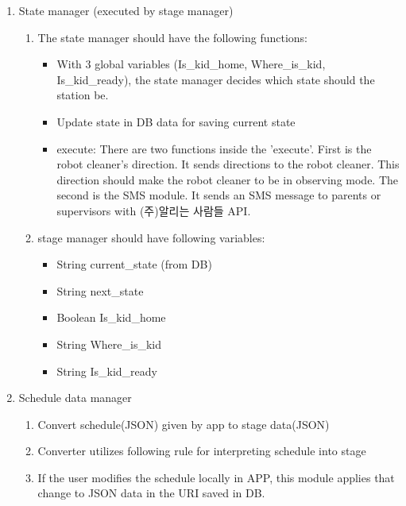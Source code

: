 \documentclass[conference]{IEEEtran}
\begin{document}
\begin{enumerate}[label=\arabic*.]
\begin{enumerate}[label=\arabic*.]
\begin{enumerate}[label=\alph*.]
\begin{enumerate}[label=\roman*.]
        \end{enumerate}
        \item {\large{State manager (executed by stage manager)}} \\
        \begin{enumerate}[label=\roman*.]
            \item {\large{The state manager should have the following functions: }}
            \begin{itemize}
                \item {With 3 global variables (Is\_kid\_home, Where\_is\_kid, Is\_kid\_ready), the state manager decides which state should the station be.}
                \item {Update state in DB data for saving current state }
                \item {execute: There are two functions inside the 'execute'. First is the robot cleaner's direction. It sends directions to the robot cleaner. This direction should make the robot cleaner to be in observing mode. The second is the SMS module. It sends an SMS message to parents or supervisors with (주)알리는 사람들 API. } \\
            \end{itemize}
            \item {\large{stage manager should have following variables: }}
             \begin{itemize}
                \item {String current\_state (from DB)}
                \item {String next\_state}
                \item {Boolean Is\_kid\_home}
                \item {String Where\_is\_kid}
                \item {String Is\_kid\_ready} \\     
            \end{itemize}
        \end{enumerate}
        \item {\large{Schedule data manager}} \\
        \begin{enumerate}[label=\roman*.]
            \item {\large{Convert schedule(JSON) given by app to stage data(JSON)}} 
            \item {\large{Converter utilizes following rule for interpreting schedule into stage}} 
            \item {\large{If the user modifies the schedule locally in APP, this module applies that change to JSON data in the URI saved in DB.}} \\

\end{enumerate}
\end{enumerate}
\end{enumerate}
\end{enumerate}
\end{document}
